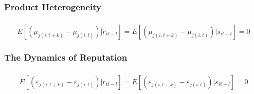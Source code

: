 \documentclass{beamer}
\begin{document}
\subsubsection{Product Heterogeneity}
\begin{frame}
\frametitle{}
$$
E[(\mu_{j(i,t+k)}-\mu_{j(i,t)})|r_{it-l}] = E[(\mu_{j(i,t+k)}-\mu_{j(i,t)})|s_{it-l}] = 0
$$
\end{frame}

\subsubsection{The Dynamics of Reputation}
\begin{frame}
\frametitle{}
$$
E[(\varepsilon_{j(i,t+k)}-\varepsilon_{j(i,t)})|r_{it-l}] = E[(\varepsilon_{j(i,t+k)}-\varepsilon_{j(i,t)})|s_{it-l}] = 0
$$
\end{frame}
\end{document}
